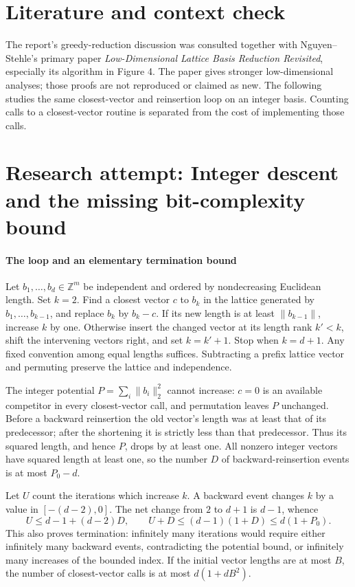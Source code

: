 \documentclass[11pt]{article}
\begin{document}
\section{Literature and context check}
The report's greedy-reduction discussion was consulted together with Nguyen--Stehle's primary paper \emph{Low-Dimensional Lattice Basis Reduction Revisited}, especially its algorithm in Figure 4. The paper gives stronger low-dimensional analyses; those proofs are not reproduced or claimed as new. The following studies the same closest-vector and reinsertion loop on an integer basis. Counting calls to a closest-vector routine is separated from the cost of implementing those calls.
\section{Research attempt: Integer descent and the missing bit-complexity bound}

\paragraph{The loop and an elementary termination bound}
Let $b_1,\ldots,b_d\in\mathbb Z^m$ be independent and ordered by nondecreasing Euclidean length. Set $k=2$. Find a closest vector $c$ to $b_k$ in the lattice generated by $b_1,\ldots,b_{k-1}$, and replace $b_k$ by $b_k-c$. If its new length is at least $\lVert b_{k-1}\rVert$, increase $k$ by one. Otherwise insert the changed vector at its length rank $k'<k$, shift the intervening vectors right, and set $k=k'+1$. Stop when $k=d+1$. Any fixed convention among equal lengths suffices. Subtracting a prefix lattice vector and permuting preserve the lattice and independence.

The integer potential $P=\sum_i\lVert b_i\rVert_2^2$ cannot increase: $c=0$ is an available competitor in every closest-vector call, and permutation leaves $P$ unchanged. Before a backward reinsertion the old vector's length was at least that of its predecessor; after the shortening it is strictly less than that predecessor. Thus its squared length, and hence $P$, drops by at least one. All nonzero integer vectors have squared length at least one, so the number $D$ of backward-reinsertion events is at most $P_0-d$.

Let $U$ count the iterations which increase $k$. A backward event changes $k$ by a value in $[-(d-2),0]$. The net change from $2$ to $d+1$ is $d-1$, whence
\[
 U\leq d-1+(d-2)D,\qquad
 U+D\leq(d-1)(1+D)\leq d(1+P_0).
\]
This also proves termination: infinitely many iterations would require either infinitely many backward events, contradicting the potential bound, or infinitely many increases of the bounded index. If the initial vector lengths are at most $B$, the number of closest-vector calls is at most $d(1+dB^2)$.
\end{document}
